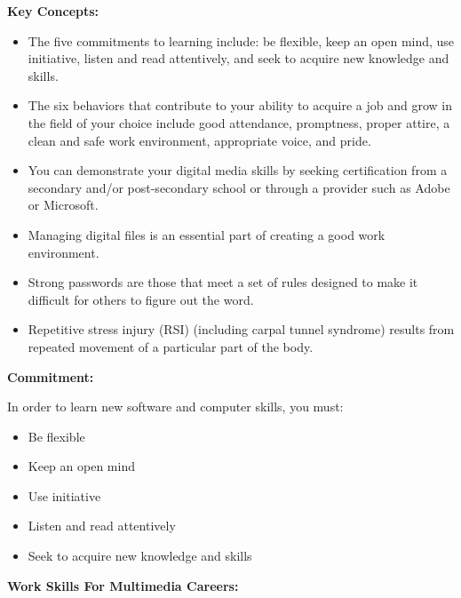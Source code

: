 \documentclass{report}
\begin{document}
    \pagebreak
    \begin{Large}
        \noindent \textbf{Key Concepts:}
    \end{Large}

    \bigbreak \noindent 
    \begin{itemize}
        \item The five commitments to learning include: be flexible, keep an open mind, use initiative, listen and read attentively, and seek to acquire new knowledge and skills. 
        \item The six behaviors that contribute to your ability to acquire a job and grow in the field of your choice include good attendance, promptness, proper attire, a clean and safe work environment, appropriate voice, and pride. 
        \item You can demonstrate your digital media skills by seeking certification from a secondary and/or post-secondary school or through a provider such as Adobe or Microsoft.
        \item Managing digital files is an essential part of creating a good work environment. 
        \item Strong passwords are those that meet a set of rules designed to make it difficult for others to figure out the word. 
        \item Repetitive stress injury (RSI) (including carpal tunnel syndrome) results from repeated movement of a particular part of the body.
    \end{itemize}

    \bigbreak \noindent \bigbreak \noindent \bigbreak \noindent  
    \begin{Large}
        \noindent \textbf{Commitment:}
    \end{Large}
    \bigbreak \noindent 
    In order to learn new software and computer skills, you must:

    \bigbreak \noindent 
    \begin{itemize}
        \item Be flexible
        \item Keep an open mind
        \item Use initiative
        \item Listen and read attentively
        \item Seek to acquire new knowledge and skills
    \end{itemize}

    \bigbreak \noindent \bigbreak \noindent \bigbreak \noindent 
    \begin{Large}
        \textbf{Work Skills For Multimedia Careers:}
    \end{Large}
\end{document}
